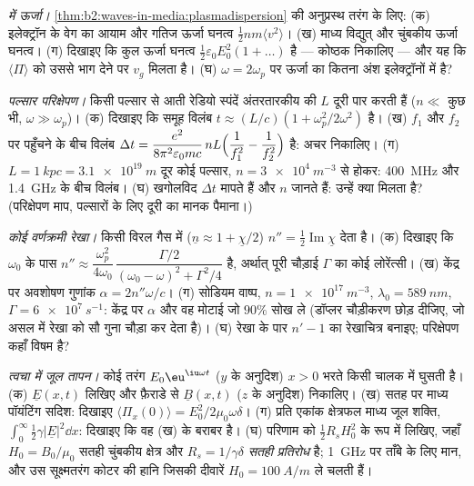 \begin{exercise}[$\star\star$]\label{exo:b2:waves-in-media:7}
\emph{ में ऊर्जा।} \cref{thm:b2:waves-in-media:plasmadispersion} की
अनुप्रस्थ तरंग के लिए: (क) इलेक्ट्रॉन के वेग का
आयाम और गतिज ऊर्जा घनत्व $\tfrac12nm\langle v^2\rangle$। (ख)
माध्य विद्युत् और चुंबकीय ऊर्जा घनत्व। (ग) दिखाइए कि कुल
ऊर्जा घनत्व $\tfrac12\varepsilon_0E_0^2(1 + \dots)$ है --- कोष्ठक निकालिए ---
और यह कि $\langle\Pi\rangle$ को उससे भाग देने पर $v_g$ मिलता है। (घ) $\omega = 2\omega_p$ पर
ऊर्जा का कितना अंश इलेक्ट्रॉनों में है?
\end{exercise}

\begin{exercise}[$\star\star$]\label{exo:b2:waves-in-media:8}
\emph{पल्सार परिक्षेपण।} किसी पल्सार से आती रेडियो स्पंदें अंतरतारकीय
 की $L$ दूरी पार करती हैं ($n \ll$ कुछ भी, $\omega \gg \omega_p$)। (क) दिखाइए
कि समूह विलंब $t \approx (L/c)(1 + \omega_p^2/2\omega^2)$ है। (ख) $f_1$ और $f_2$ पर
पहुँचने के बीच विलंब $\Delta t = \dfrac{e^2}{8\pi^2
\varepsilon_0mc}\,nL\Bigl(\dfrac1{f_1^2} - \dfrac1{f_2^2}\Bigr)$ है: अचर निकालिए।
(ग) $L = \qty{1}{kpc} = \qty{3.1e19}{m}$ दूर कोई पल्सार, $n = \qty{3e4}{m^{-3}}$ से होकर:
\qty{400}{MHz} और \qty{1.4}{GHz} के बीच विलंब। (घ) खगोलविद
$\Delta t$ मापते हैं और $n$ जानते हैं: उन्हें क्या मिलता है? (परिक्षेपण माप, पल्सारों के लिए
दूरी का मानक पैमाना।)
\end{exercise}

\begin{exercise}[$\star\star$]\label{exo:b2:waves-in-media:9}
\emph{कोई वर्णक्रमी रेखा।} किसी विरल गैस में ($\underline n \approx 1 + \underline\chi/2$)
 $n'' = \tfrac12\operatorname{Im}\underline\chi$ देता है। (क) दिखाइए कि $\omega_0$ के
पास $n'' \approx \dfrac{\omega_p^2}{4\omega_0}\,\dfrac{\Gamma/2}{(\omega_0 - \omega)^2 + \Gamma^2/4}$ है, अर्थात् पूरी
चौड़ाई $\Gamma$ का कोई लोरेंत्सी। (ख) केंद्र पर अवशोषण गुणांक $\alpha = 2n''\omega/c$।
(ग) सोडियम वाष्प, $n = \qty{1e17}{m^{-3}}$, $\lambda_0 = \qty{589}{nm}$,
$\Gamma = \qty{6e7}{s^{-1}}$: केंद्र पर $\alpha$ और वह मोटाई जो $90\%$
सोख ले (डॉप्लर चौड़ीकरण छोड़ दीजिए, जो असल में रेखा को
सौ गुना चौड़ा कर देता है)। (घ) रेखा के पार $n' - 1$ का रेखाचित्र बनाइए;
परिक्षेपण कहाँ विषम है?
\end{exercise}

\begin{exercise}[$\star\star\star$]\label{exo:b2:waves-in-media:10}
\emph{त्वचा में जूल तापन।} कोई तरंग $E_0\eu^{\iu\omega t}$ ($y$ के अनुदिश)
$x > 0$ भरते किसी चालक में घुसती है। (क) $\underline E(x, t)$ लिखिए और फ़ैराडे से
$\underline B(x, t)$ ($z$ के अनुदिश) निकालिए। (ख) सतह पर माध्य पॉयंटिंग सदिश:
दिखाइए $\langle\Pi_x(0)\rangle = E_0^2/2\mu_0\omega\delta$। (ग) प्रति एकांक क्षेत्रफल माध्य
जूल शक्ति, $\int_0^\infty\tfrac12\gamma|\underline E|^2\dd x$: दिखाइए कि वह
(ख) के बराबर है। (घ) परिणाम को $\tfrac12R_sH_0^2$ के रूप में लिखिए, जहाँ $H_0 = B_0/\mu_0$
सतही चुंबकीय क्षेत्र और $R_s = 1/\gamma\delta$ \emph{सतही प्रतिरोध} है;
\qty{1}{GHz} पर ताँबे के लिए मान, और उस सूक्ष्मतरंग कोटर की
हानि जिसकी दीवारें $H_0 = \qty{100}{A/m}$ ले चलती हैं।
\end{exercise}

